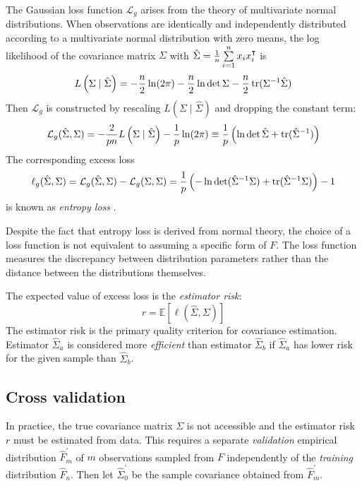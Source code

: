 The Gaussian loss function $\mathcal L_g$  arises from the theory of multivariate normal distributions. When observations are identically and independently distributed according to a multivariate normal distribution with zero means, the log likelihood of the covariance matrix $\Sigma$ with $\hat\Sigma = \frac 1 n \sum\limits_{i=1}^n x_i x_i^\intercal$ is  
\begin{equation}
L\left(\Sigma \mid \hat\Sigma\right) = -\frac n 2 \ln(2\pi) - \frac n 2 \ln \det \Sigma - \frac n 2 \operatorname{tr}(\Sigma^{-1} \hat \Sigma)
\end{equation}
Then $\mathcal L_g$ is constructed by rescaling $L\left(\Sigma \mid \hat\Sigma\right)$ and dropping the constant term:
\begin{equation}\label{eq:GaussLoss}
\mathcal L_g(\hat\Sigma,\Sigma) 
=  -\frac 2 {pn} L\left(\Sigma \mid \hat\Sigma \right) - \frac 1 p \ln(2\pi) 
\equiv  \frac 1 p\left(\ln \det \hat \Sigma + \operatorname{tr}(\hat \Sigma^{-1}) \right) 
\end{equation}
The corresponding excess loss 
\begin{equation}
\ell_g(\hat\Sigma,\Sigma) = \mathcal L_g(\hat\Sigma,\Sigma) - \mathcal L_g(\Sigma,\Sigma)  
= \frac 1 p \left(-\ln \det (\hat \Sigma^{-1} \Sigma) + \operatorname{tr}(\hat \Sigma^{-1}\Sigma)\right) - 1
\end{equation}
is known as \emph{entropy loss} \citep{James:1961}.

Despite the fact that entropy loss is derived from normal theory, the choice of a loss function is not equivalent to assuming a specific form of $F$. The loss function measures the discrepancy between distribution parameters rather than the distance between the distributions themselves.  

The expected value of excess loss is the \emph{estimator risk}:
\begin{equation}\label{eq:risk}
r = \mathbb E\left[\ell(\hat\Sigma,\Sigma)\right]
\end{equation}
The estimator risk is the primary quality criterion for covariance estimation. Estimator $\hat\Sigma_a$ is considered more \emph{efficient} than estimator $\hat\Sigma_b$ if $\hat\Sigma_a$ has lower risk for the given sample than $\hat\Sigma_b$.   

\subsection{Cross validation}
In practice, the true covariance matrix $\Sigma$ is not accessible and the estimator risk $r$ must be estimated from data. This requires a separate \emph{validation} empirical distribution $\hat F_m^\prime$ of $m$ observations sampled from $F$ independently of the \emph{training} distribution $\hat F_n$. 
Then let  $\hat \Sigma_0^\prime$ be the sample covariance obtained from $\hat F_m^\prime$. 

